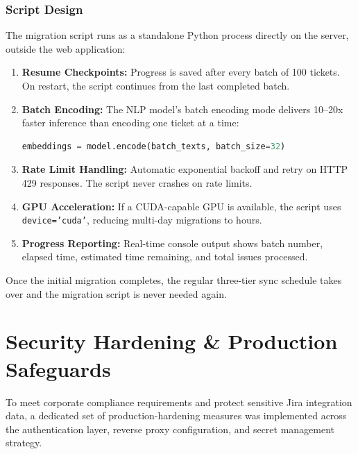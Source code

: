 \documentclass[12pt, a4paper]{article}
\begin{document}
\subsubsection{Script Design}

The migration script runs as a standalone Python process directly on the server, outside the web application:

\begin{enumerate}
    \item \textbf{Resume Checkpoints:} Progress is saved after every batch of 100 tickets. On restart, the script continues from the last completed batch.

    \item \textbf{Batch Encoding:} The NLP model's batch encoding mode delivers 10--20x faster inference than encoding one ticket at a time:
\begin{lstlisting}[language=Python]
embeddings = model.encode(batch_texts, batch_size=32)
\end{lstlisting}

    \item \textbf{Rate Limit Handling:} Automatic exponential backoff and retry on HTTP 429 responses. The script never crashes on rate limits.

    \item \textbf{GPU Acceleration:} If a CUDA-capable GPU is available, the script uses \texttt{device='cuda'}, reducing multi-day migrations to hours.

    \item \textbf{Progress Reporting:} Real-time console output shows batch number, elapsed time, estimated time remaining, and total issues processed.
\end{enumerate}

Once the initial migration completes, the regular three-tier sync schedule takes over and the migration script is never needed again.


\section{Security Hardening \& Production Safeguards}

To meet corporate compliance requirements and protect sensitive Jira integration data, a dedicated set of production-hardening measures was implemented across the authentication layer, reverse proxy configuration, and secret management strategy.
\end{document}
